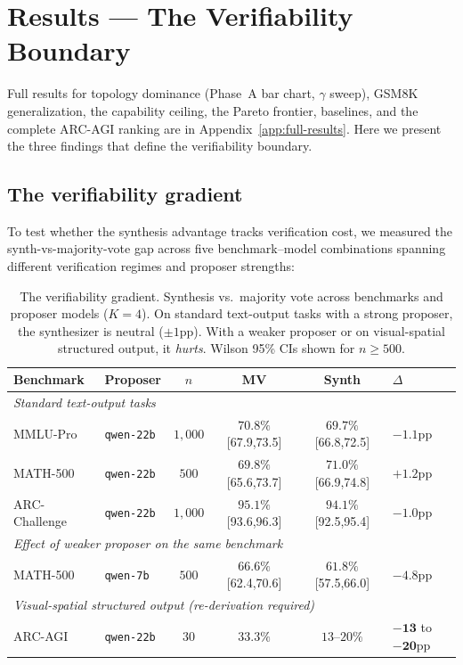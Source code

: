 \documentclass[11pt]{amsart}
\newcommand{\g}{\gamma}
\newcommand\1{{\mathds{1}}}
\theoremstyle{definition}
\theoremstyle{remark}
\numberwithin{equation}{section}
\begin{document}
\section{Results --- The Verifiability Boundary}\label{sec:results}

Full results for topology dominance (Phase~A bar chart, $\g$ sweep), GSM8K generalization, the capability ceiling, the Pareto frontier, baselines, and the complete ARC-AGI ranking are in Appendix~\ref{app:full-results}.
Here we present the three findings that define the verifiability boundary.

\subsection{The verifiability gradient}\label{sec:gradient}

To test whether the synthesis advantage tracks verification cost, we measured the synth-vs-majority-vote gap across five benchmark--model combinations spanning different verification regimes and proposer strengths:

\begin{table}[h]
\centering\small
\caption{The verifiability gradient. Synthesis vs.\ majority vote across benchmarks and proposer models ($K\!=\!4$). On standard text-output tasks with a strong proposer, the synthesizer is neutral ($\pm 1$pp). With a weaker proposer or on visual-spatial structured output, it \emph{hurts}. Wilson 95\% CIs shown for $n\!\geq\!500$.}
\label{tab:gradient}
\begin{tabular}{@{}llcccl@{}}
\toprule
Benchmark & Proposer & $n$ & MV & Synth & $\Delta$ \\
\midrule
\multicolumn{6}{l}{\emph{Standard text-output tasks}} \\
MMLU-Pro & \texttt{qwen-22b} & $1{,}000$ & $70.8\%$ {\scriptsize[67.9,73.5]} & $69.7\%$ {\scriptsize[66.8,72.5]} & $-1.1$pp \\
MATH-500 & \texttt{qwen-22b} & $500$ & $69.8\%$ {\scriptsize[65.6,73.7]} & $71.0\%$ {\scriptsize[66.9,74.8]} & $+1.2$pp \\
ARC-Challenge & \texttt{qwen-22b} & $1{,}000$ & $95.1\%$ {\scriptsize[93.6,96.3]} & $94.1\%$ {\scriptsize[92.5,95.4]} & $-1.0$pp \\
\midrule
\multicolumn{6}{l}{\emph{Effect of weaker proposer on the same benchmark}} \\
MATH-500 & \texttt{qwen-7b} & $500$ & $66.6\%$ {\scriptsize[62.4,70.6]} & $61.8\%$ {\scriptsize[57.5,66.0]} & $\mathbf{-4.8}$pp \\
\midrule
\multicolumn{6}{l}{\emph{Visual-spatial structured output (re-derivation required)}} \\
ARC-AGI & \texttt{qwen-22b} & $30$ & $33.3\%$ & $13$--$20\%$ & $\mathbf{-13}$ to $\mathbf{-20}$pp \\
\bottomrule
\end{tabular}
\end{table}
\end{document}
